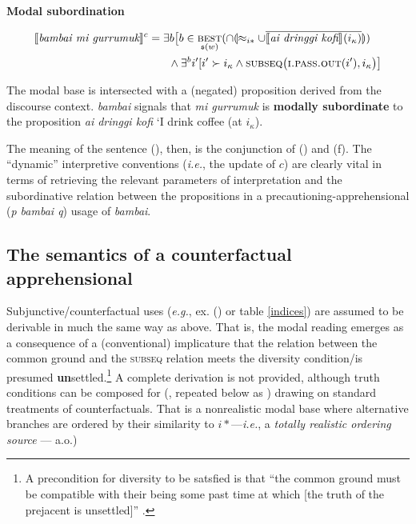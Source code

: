 \pex[exno=\getref{app-deriv}]\a[label=f]\textbf{Modal subordination}


$$\begin{multlined} \denote[c]{\textit{bambai mi gurrumuk}} = \exists b\big[b\in\underset{\mathfrak s(w)}{\textsc{best}}(\cap\llparenthesis\approx_{i*}\cup\overline{\denote{\textit{ai dringgi kofi}}(i_\kappa)}\rrparenthesis)\\\wedge \exists^bi'[i'\succ i_\kappa\wedge \textsc{subseq}\big(\textsc{i.pass.out}(i'),i_\kappa\big)\big]\end{multlined}$$


The modal base is intersected with a (negated) proposition derived from the discourse context. \textit{bambai} signals that \textit{mi gurrumuk} is \textbf{modally subordinate} to the proposition \textit{ai dringgi kofi} `I drink coffee (at $ i_\kappa $).
\xe

\noindent The meaning of the sentence (), then, is the conjunction of () and (f). The ``dynamic'' interpretive conventions (\textit{i.e.}, the update of $ c $) are clearly vital in terms of retrieving the relevant parameters of interpretation and the subordinative relation between the propositions in a precautioning-apprehensional (\textit{p bambai q}) usage of \textit{bambai}.

\subsection{The semantics of a counterfactual apprehensional}

Subjunctive/counterfactual uses (\textit{e.g.}, ex. () or table \ref{indices}) are assumed to be derivable in much the same way as above. That is, the modal reading emerges as a consequence of a (conventional) implicature that the relation between the common ground and the \textsc{subseq} relation meets the diversity condition/is presumed \textbf{un}settled.\footnote{A precondition for diversity to be satsfied is that ``the common ground must be compatible with their being some past time at which [the truth of the prejacent is unsettled]'' \citep[85]{Condoravdi2002}.} A complete derivation is not provided, although truth conditions can be composed for (, repeated below as ) drawing on standard treatments of counterfactuals. That is a nonrealistic modal base where alternative branches are ordered by their similarity to $ i* $---\textit{i.e.}, a \textit{totally realistic ordering source} --- \citealp[\textit{cf.}][]{Kratzer1981a,Kratzer2012,Lewis1973,Lewis1981} a.o.)

